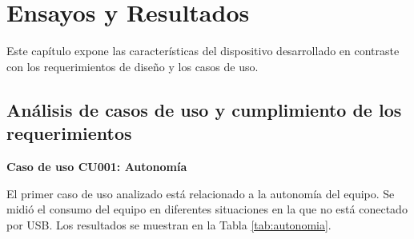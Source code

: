 
\chapter{Ensayos y Resultados} %

\label{Chapter4} %

Este capítulo expone las características del dispositivo desarrollado en contraste con los requerimientos de diseño y los casos de uso.

\section{Análisis de casos de uso y cumplimiento de los requerimientos}
\label{sec:pruebasHW}

\textbf{Caso de uso CU001: Autonomía}

El primer caso de uso analizado está relacionado a la autonomía del equipo. Se midió el consumo del equipo en diferentes situaciones en la que no está conectado por USB. Los resultados se muestran en la Tabla \ref{tab:autonomia}.

